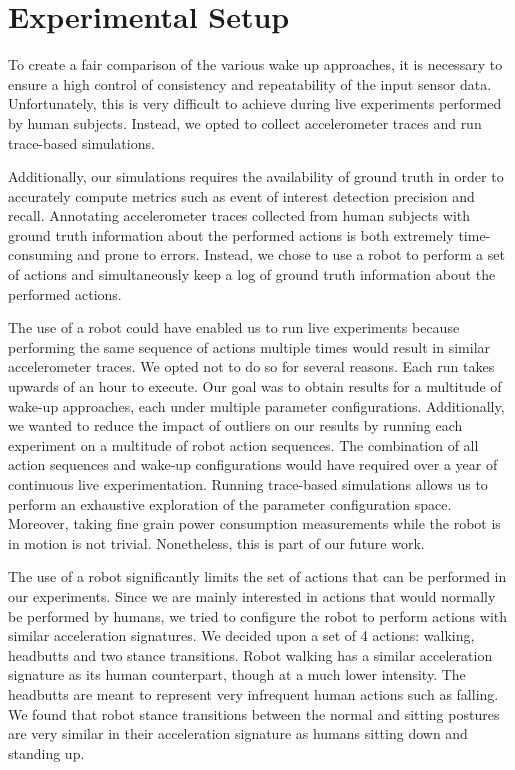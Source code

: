 \section{Experimental Setup}
\label{sec:experimentalSetup}

To create a fair comparison of the various wake up approaches, it is necessary to ensure a high control of consistency and repeatability of the input sensor data. Unfortunately, this is very difficult to achieve during live experiments performed by human subjects. Instead, we opted to collect accelerometer traces and run trace-based simulations.

Additionally, our simulations requires the availability of ground truth in order to accurately compute metrics such as event of interest detection precision and recall. Annotating accelerometer traces collected from human subjects with ground truth information about the performed actions is both extremely time-consuming and prone to errors. Instead, we chose to use a robot to perform a set of actions and simultaneously keep a log of ground truth information about the performed actions.

The use of a robot could have enabled us to run live experiments because performing the same sequence of actions multiple times would result in similar accelerometer traces. We opted not to do so for several reasons. Each run takes upwards of an hour to execute. Our goal was to obtain results for a multitude of wake-up approaches, each under multiple parameter configurations. Additionally, we wanted to reduce the impact of outliers on our results by running each experiment on a multitude of robot action sequences. The combination of all action sequences and wake-up configurations would have required over a year of continuous live experimentation. Running trace-based simulations allows us to perform an exhaustive exploration of the parameter configuration space. Moreover, taking fine grain power consumption measurements while the robot is in motion is not trivial. Nonetheless, this is part of our future work.

The use of a robot significantly limits the set of actions that can be performed in our experiments. Since we are mainly interested in actions that would normally be performed by humans, we tried to configure the robot to perform actions with similar acceleration signatures. We decided upon a set of 4 actions: walking, headbutts and two stance transitions. Robot walking has a similar acceleration signature as its human counterpart, though at a much lower intensity. The headbutts are meant to represent very infrequent human actions such as falling. We found that robot stance transitions between the normal and sitting postures are very similar in their acceleration signature as humans sitting down and standing up.

